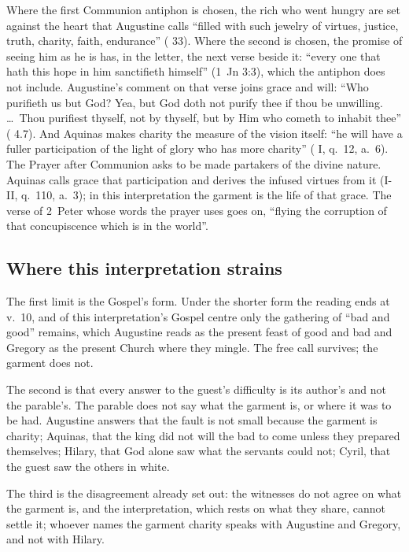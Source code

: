 Where the first Communion antiphon is chosen, the rich who went hungry are set
against the heart that Augustine calls ``filled with such jewelry of virtues,
justice, truth, charity, faith, endurance'' (
33). Where the second is chosen, the promise of seeing him as he is has, in
the letter, the next verse beside it: ``every one that hath this hope in him
sanctifieth himself'' (1~Jn 3:3), which the antiphon does not include.
Augustine's comment on that verse joins grace and will: ``Who purifieth us but
God? Yea, but God doth not purify thee if thou be unwilling. \ldots\ Thou
purifiest thyself, not by thyself, but by Him who cometh to inhabit thee''
( 4.7). And Aquinas makes charity
the measure of the vision itself: ``he will have a fuller participation of the
light of glory who has more charity'' ( I, q.~12, a.~6).
The Prayer after Communion asks to be made partakers of the divine nature.
Aquinas calls grace that participation and derives the infused virtues from
it (I-II, q.~110, a.~3); in this interpretation the garment is the life of that
grace. The verse of 2~Peter whose words the
prayer uses goes on, ``flying the corruption of that concupiscence which is in
the world''.

\subsection{Where this interpretation strains}

The first limit is the Gospel's form. Under the shorter form the reading ends
at v.~10, and of this interpretation's Gospel centre only the gathering of
``bad and good'' remains, which Augustine reads as the present feast of good
and bad and Gregory as the present Church where they mingle. The free call
survives; the garment does not.

The second is that every answer to the guest's difficulty is its author's and
not the parable's. The parable does not say what the garment is, or where it
was to be had. Augustine answers that the fault is not small because the
garment is charity; Aquinas, that the king did not will the bad to come unless
they prepared themselves; Hilary, that God alone saw what the servants could
not; Cyril, that the guest saw the others in white.

The third is the disagreement already set out: the witnesses do not agree on
what the garment is, and the interpretation, which rests on what they share,
cannot settle it; whoever names the garment charity speaks with Augustine and
Gregory, and not with Hilary.

